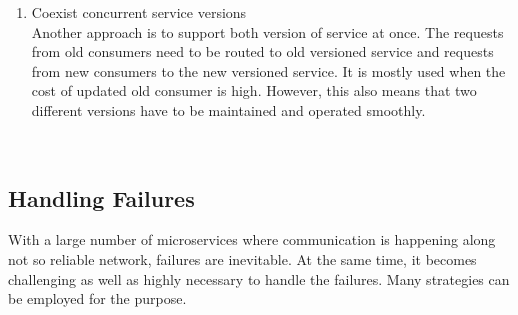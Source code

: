 \begin{enumerate}
\item Coexist concurrent service versions \\ Another approach is to support both version of service at once. The requests from old consumers need to be routed to old versioned service and requests from new consumers to the new versioned service. It is mostly used when the cost of updated old consumer is high. However, this also means that two different versions have to be maintained and operated smoothly.
\end{enumerate}
\\
\subsection{Handling Failures}\label{section:challanges_of_microservices_architecture/integration/handling_failures}
With a large number of microservices where communication is happening along not so reliable network, failures are inevitable. At the same time, it becomes challenging as well as highly necessary to handle the failures. Many strategies can be employed for the purpose. \cite{Newman:2015aa}\cite{Richardson:2015ab}\cite{Nygard:2007aa}
